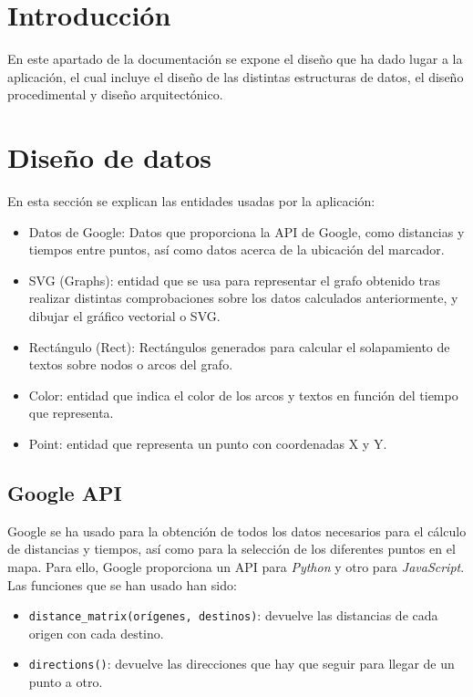 
\section{Introducción}
En este apartado de la documentación se expone el diseño que ha dado lugar a la aplicación, el cual incluye el diseño de las distintas estructuras de datos, el diseño procedimental y diseño arquitectónico.

\section{Diseño de datos}
En esta sección se explican las entidades usadas por la aplicación:
\begin{itemize}
	\item Datos de Google: Datos que proporciona la API de Google, como distancias y tiempos entre puntos, así como datos acerca de la ubicación del marcador.
	\item SVG (Graphs): entidad que se usa para representar el grafo obtenido tras realizar distintas comprobaciones sobre los datos calculados anteriormente, y dibujar el gráfico vectorial o SVG.
	\item Rectángulo (Rect): Rectángulos generados para calcular el solapamiento de textos sobre nodos o arcos del grafo.
	\item Color: entidad que indica el color de los arcos y textos en función del tiempo que representa.
	\item Point: entidad que representa un punto con coordenadas X y Y.
\end{itemize}



\subsection{Google API}
Google se ha usado para la obtención de todos los datos necesarios para el cálculo de distancias y tiempos, así como para la selección de los diferentes puntos en el mapa. Para ello, Google proporciona un API para \textit{Python} y otro para \textit{JavaScript}. Las funciones que se han usado han sido:
\begin{itemize}
	\item \texttt{distance\_matrix(orígenes, destinos)}: devuelve las distancias de cada origen con cada destino.
	\item \texttt{directions()}: devuelve las direcciones que hay que seguir para llegar de un punto a otro.
\end{itemize}

